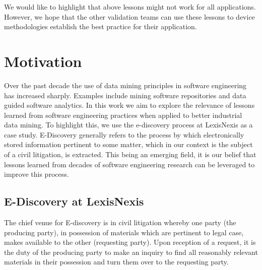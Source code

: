 \documentclass{sig-alternate-05-2015}
\begin{document}
We would like to highlight that above lessons might not work for all applications. However, we hope that the other validation teams can use these lessons to device methodologies establish the best practice for their application. 



\section{Motivation}
Over the past decade the use of data mining principles in software engineering has increased sharply. Examples include mining software repositories and data guided software analytics. In this work we aim to explore the relevance of lessons learned from software engineering practices when applied to better industrial data mining. To highlight this, we use the e-discovery process at LexisNexis as a case study. E-Discovery generally refers to the process by which electronically stored information pertinent to some matter, which in our context is the subject of a civil litigation, is extracted. This being an emerging field, it is our belief that lessons learned from decades of software engineering research can be leveraged to improve this process.

\subsection{E-Discovery at LexisNexis}
\label{sect:edisc}
The chief venue for E-discovery is in civil litigation whereby one party (the producing party), in possession of materials which are pertinent to legal case, makes available to the other (requesting party). Upon reception of a request, it is the duty of the producing party to make an inquiry to find all reasonably relevant materials in their possession and turn them over to the requesting party.
             
\end{document}
